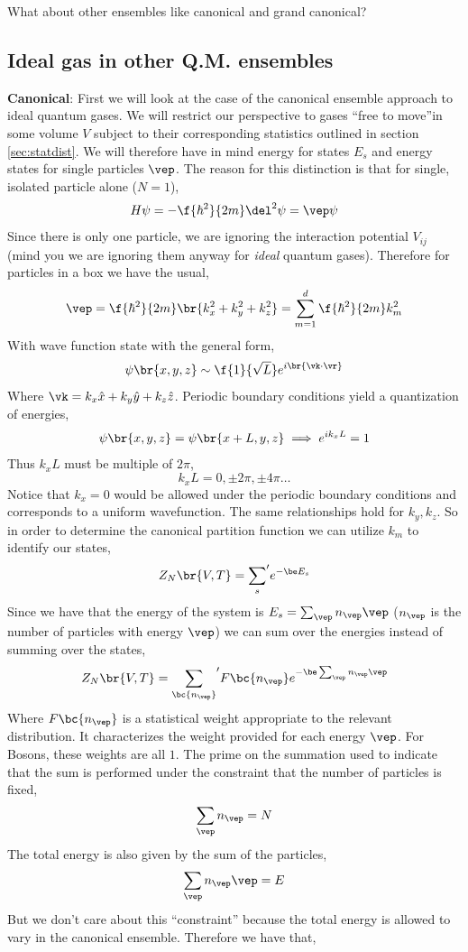 \documentclass{article}
\begin{document}
{What about other ensembles like canonical and grand canonical?

\subsection{Ideal gas in other Q.M. ensembles}

\textbf{Canonical}: First we will look at the case of the canonical ensemble approach to ideal quantum gases. We will restrict our perspective to gases ``free to move''in some volume $V$ subject to their corresponding statistics outlined in section \eqref{sec:statdist}. We will therefore have in mind energy for states $E_s$ and energy states for single particles $\vep$. The reason for this distinction is that for single, isolated particle alone ($N=1$),
\[ H \psi = -\f{\hbar^2}{2m} \del^2 \psi = \vep \psi \]
Since there is only one particle, we are ignoring the interaction potential $V_{ij}$ (mind you we are ignoring them anyway for \textit{ideal} quantum gases). Therefore for particles in a box we have the usual,
\[ \vep = \f{\hbar^2}{2m} \br{k_x^2 + k_y^2 + k_z^2} = \sum_{m=1}^{d} \f{\hbar^2}{2m} k_m^2 \]
With wave function state with the general form,
\[ \psi\br{x,y,z} \sim \f{1}{\sqrt{L}} e^{i\br{\vk \cdot \vr}} \]
Where $\vk = k_x \hat{x} + k_y \hat{y} + k_z \hat{z}$. Periodic boundary conditions yield a quantization of energies,
\[\psi\br{x,y,z} = \psi\br{x+L,y,z} \implies e^{ik_x L} = 1 \]
Thus $k_x L$ must be multiple of $2\pi$,
\[ k_x L = 0, \pm 2\pi, \pm 4\pi\ldots  \]
Notice that $k_x = 0$ would be allowed under the periodic boundary conditions and corresponds to a uniform wavefunction. The same relationships hold for $k_y, k_z$. So in order to determine the canonical partition function we can utilize $k_m$ to identify our states,
\[ Z_{N}\br{V,T} = {\sum_s}' e^{-\be E_s}  \]
Since we have that the energy of the system is $E_s = \sum_{\vep} n_\vep \vep$ ($n_\vep$ is the number of particles with energy $\vep$) we can sum over the energies instead of summing over the states,
\[ Z_{N}\br{V,T} = {\sum_{\bc{n_\vep}}}' F\bc{n_\vep} e^{-\be \sum_{\vep} n_\vep \vep} \]
Where $F\bc{n_\vep}$ is a statistical weight appropriate to the relevant distribution. It characterizes the weight provided for each energy $\vep$. For Bosons, these weights are all $1$. The prime on the summation used to indicate that the sum is performed under the constraint that the number of particles is fixed,
\[ \sum_{\vep} n_\vep = N \]
The total energy is also given by the sum of the particles,
\[ \sum_\vep n_\vep \vep = E\]
But we don't care about this ``constraint'' because the total energy is allowed to vary in the canonical ensemble. Therefore we have that,
}
\end{document}
